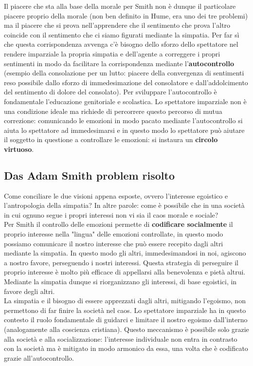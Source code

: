\documentclass[10pt,a4paper]{article}
\begin{document}
Il piacere che sta alla base della morale per Smith non è dunque il particolare piacere proprio della morale (non ben definito in Hume, era uno dei tre problemi) ma il piacere che si prova nell'apprendere che il sentimento che prova l'altro coincide con il sentimento che ci siamo figurati mediante la simpatia. Per far sì che questa corrispondenza avvenga c'è bisogno dello sforzo dello spettatore nel rendere imparziale la propria simpatia e dell'agente a correggere i propri sentimenti in modo da facilitare la corrispondenza mediante l'\textbf{autocontrollo} (esempio della consolazione per un lutto: piacere della convergenza di sentimenti reso possibile dallo sforzo di immedesimazione del consolatore e dall'addolcimento del sentimento di dolore del consolato). Per sviluppare l'autocontrollo è fondamentale l'educazione genitoriale e scolastica. Lo spettatore imparziale non è una condizione ideale ma richiede di percorrere questo percorso di mutua correzione: comunicando le emozioni in modo pacato mediante l'autocontrollo si aiuta lo spettatore ad immedesimarsi e in questo modo lo spettatore può aiutare il soggetto in questione a controllare le emozioni: si instaura un \textbf{circolo virtuoso}. 
\subsection{Das Adam Smith problem risolto}
Come conciliare le due visioni appena esposte, ovvero l'interesse egoistico e l'antropologia della simpatia? In altre parole: come è possibile che in una società in cui ognuno segue i propri interessi non vi sia il caos morale e sociale?\\
Per Smith il controllo delle emozioni permette di \textbf{codificare socialmente} il proprio interesse nella "lingua" delle emozioni controllate, in questo modo possiamo comunicare il nostro interesse che può essere recepito dagli altri mediante la simpatia. In questo modo gli altri, immedesimandosi in noi, agiscono a nostro favore, perseguendo i nostri interessi. Questa strategia di perseguire il proprio interesse è molto più efficace di appellarsi alla benevolenza e pietà altrui. Mediante la simpatia dunque si riorganizzano gli interessi, di base egoistici, in favore degli altri.\\
La simpatia e il bisogno di essere apprezzati dagli altri, mitigando l'egoismo, non permettono di far finire la società nel caos. Lo spettatore imparziale ha in questo contesto il ruolo fondamentale di guidarci e limitare il nostro egoismo dall'interno (analogamente alla coscienza cristiana). Questo meccanismo è possibile solo grazie alla società e alla socializzazione: l'interesse individuale non entra in contrasto con la società ma è mitigato in modo armonico da essa, una volta che è codificato grazie all'autocontrollo.
\newpage
\end{document}
